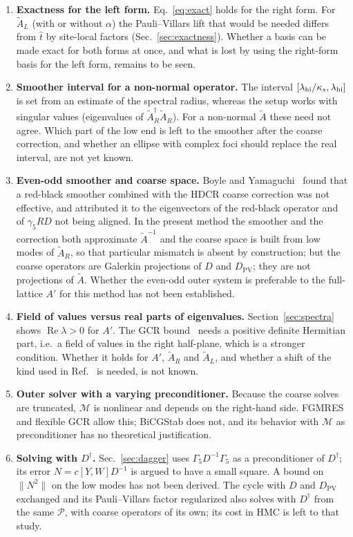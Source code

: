 \documentclass[11pt,a4paper]{article}
\numberwithin{equation}{section}
\newcommand{\dg}{^{\dagger}}
\newcommand{\Dpv}{D_{\mathrm{PV}}}
\newcommand{\Gfive}{\Gamma_5}
\newcommand{\AR}{\tilde A_{R}}
\newcommand{\AL}{\tilde A_{L}}
\newcommand{\Pro}{\mathcal P}
\renewcommand{\Re}{\operatorname{Re}}
\begin{document}
\begin{enumerate}
\item \textbf{Exactness for the left form.} Eq.~\eqref{eq:exact} holds
for the right form. For $\AL$ (with or without $\alpha$) the Pauli--Villars lift
that would be needed differs from $\hat t$ by site-local factors (Sec.~\ref{sec:exactness}). Whether a basis can be made exact for both forms at
once, and what is lost by using the right-form basis for the left form, remains to be seen.

\item \textbf{Smoother interval for a non-normal operator.} The interval
$[\lambda_{\rm hi}/\kappa_s,\lambda_{\rm hi}]$ is set from an estimate of the
spectral radius, whereas the setup works with singular values (eigenvalues of
$\AR\dg\AR$). For a non-normal $\tilde A$ these need not agree. Which part of
the low end is left to the smoother after the coarse correction, and whether an
ellipse with complex foci should replace the real interval, are not yet known.

\item \textbf{Even-odd smoother and coarse space.} Boyle and
Yamaguchi~\cite{BY} found that a red-black smoother combined with the HDCR
coarse correction was not effective, and attributed it to the eigenvectors of
the red-black operator and of $\gamma_5RD$ not being aligned. In the present
method the smoother and the correction both approximate $\tilde A^{-1}$ and the
coarse space is built from low modes of $\AR$, so that particular mismatch is
absent by construction; but the coarse operators are Galerkin projections of
$D$ and $\Dpv$; they are not projections of $\tilde A$. Whether the even-odd outer system is
preferable to the full-lattice $A'$ for this method has not been established.

\item \textbf{Field of values versus real parts of eigenvalues.}
Section~\ref{sec:spectra} shows $\Re\lambda>0$ for $A'$. The GCR bound~\cite{ESS}
needs a positive definite Hermitian part, i.e.\ a field of values in the right
half-plane, which is a stronger condition. Whether it holds for $A'$, $\AR$ and
$\AL$, and whether a shift of the kind used in Ref.~\cite{BoyleOare} is needed,
is not known.

\item \textbf{Outer solver with a varying preconditioner.} Because the coarse
solves are truncated, $\mathcal M$ is nonlinear and depends on the right-hand
side. FGMRES and flexible GCR allow this; BiCGStab does not, and its behavior
with $\mathcal M$ as preconditioner has no theoretical justification.

\item \textbf{Solving with $D\dg$.} Sec.~\ref{sec:dagger} uses $\Gfive D^{-1}\Gfive$ as a
preconditioner of $D\dg$; its error $N=c[Y,W]D^{-1}$ is argued to have a small square. A
bound on $\|N^2\|$ on the low modes has not been derived. The cycle with $D$ and $\Dpv$ exchanged
and its Pauli--Villars factor regularized also solves with $D\dg$ from the same $\Pro$, with coarse
operators of its own; its cost in HMC is left to that study.
\end{enumerate}
\end{document}
